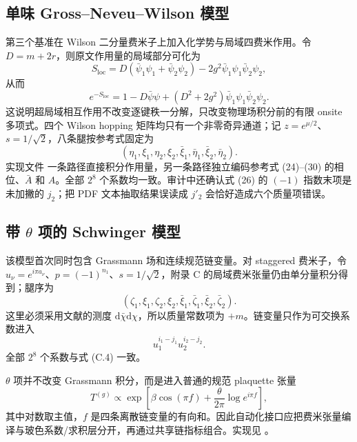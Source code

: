 \documentclass[UTF8,11pt]{ctexart}
\newcommand{\dd}{\mathrm{d}}
\begin{document}
\subsection{单味 Gross--Neveu--Wilson 模型}
第三个基准在 Wilson 二分量费米子上加入化学势与局域四费米作用。令 $D=m+2r$，则原文作用量的局域部分可化为
\begin{equation}
 S_{\mathrm{loc}}=D(\bar\psi_1\psi_1+\bar\psi_2\psi_2)
 -2g^2\bar\psi_1\psi_1\bar\psi_2\psi_2,
\end{equation}
从而
\begin{equation}
 e^{-S_{\mathrm{loc}}}=1-D\bar\psi\psi+
 (D^2+2g^2)\bar\psi_1\psi_1\bar\psi_2\psi_2.
\end{equation}
这说明超局域相互作用不改变逐键秩一分解，只改变物理场积分前的有限 onsite 多项式。四个 Wilson hopping 矩阵均只有一个非零奇异通道；记 $z=e^{\mu/2}$、$s=1/\sqrt2$，八条腿按参考式固定为
\begin{equation}
 (\eta_1,\xi_1,\eta_2,\xi_2,
 \bar\xi_1,\bar\eta_1,\bar\xi_2,\bar\eta_2).
\end{equation}
实现文件  一条路径直接积分作用量，另一条路径独立编码参考式 (24)--(30) 的相位、$\bar A$ 和 $A$。全部 $2^8$ 个系数均一致。审计中还确认式 (26) 的 $(-1)$ 指数末项是未加撇的 $j_2$；把 PDF 文本抽取结果误读成 $j'_2$ 会恰好造成六个质量项错误。

\subsection{带 \texorpdfstring{$\theta$}{theta} 项的 Schwinger 模型}
该模型首次同时包含 Grassmann 场和连续规范链变量。对 staggered 费米子，令 $u_\nu=e^{i\pi a_\nu}$、$p=(-1)^{n_1}$、$s=1/\sqrt2$，附录 C 的局域费米张量仍由单分量积分得到；腿序为
\begin{equation}
 (\zeta_1,\xi_1,\zeta_2,\xi_2,
 \bar\xi_1,\bar\zeta_1,\bar\xi_2,\bar\zeta_2).
\end{equation}
这里必须采用文献的测度 $\dd\bar\chi\dd\chi$，所以质量常数项为 $+m$。链变量只作为可交换系数进入
\begin{equation}
 u_1^{i_1-j_1}u_2^{i_2-j_2}.
\end{equation}
全部 $2^8$ 个系数与式 (C.4) 一致。

$\theta$ 项并不改变 Grassmann 积分，而是进入普通的规范 plaquette 张量
\begin{equation}
 T^{(g)}\propto
 \exp\left[\beta\cos(\pi f)+\frac{\theta}{2\pi}
 \log e^{i\pi f}\right],
\end{equation}
其中对数取主值，$f$ 是四条离散链变量的有向和。因此自动化接口应把费米张量编译与玻色系数/求积层分开，再通过共享链指标组合。实现见 。
\end{document}
